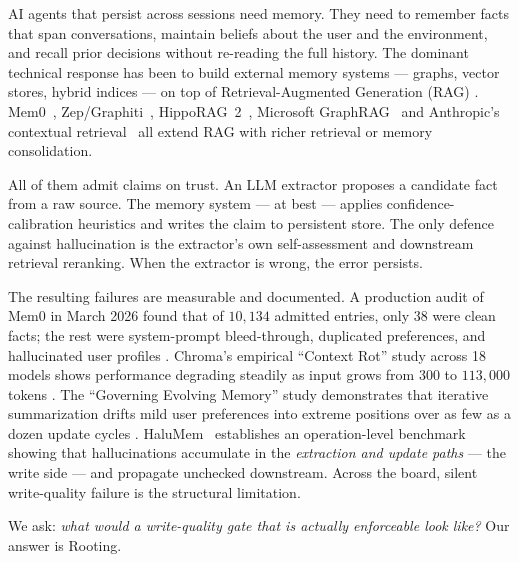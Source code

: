 \documentclass[10pt,a4paper]{article}
\begin{document}
AI agents that persist across sessions need memory. They need to remember
facts that span conversations, maintain beliefs about the user and the
environment, and recall prior decisions without re-reading the full history.
The dominant technical response has been to build external memory systems
--- graphs, vector stores, hybrid indices --- on top of Retrieval-Augmented
Generation (RAG) \cite{lewis2020rag}. Mem0~\cite{chhikara2025mem0},
Zep/Graphiti~\cite{rasmussen2025zep},
HippoRAG~2~\cite{gutierrez2025hipporag2}, Microsoft
GraphRAG~\cite{edge2024graphrag} and Anthropic's contextual
retrieval~\cite{anthropic2024contextual} all extend RAG with richer
retrieval or memory consolidation.

All of them admit claims on trust. An LLM extractor proposes a candidate
fact from a raw source. The memory system --- at best --- applies
confidence-calibration heuristics and writes the claim to persistent store.
The only defence against hallucination is the extractor's own self-assessment
and downstream retrieval reranking. When the extractor is wrong, the error
persists.

The resulting failures are measurable and documented. A production audit of
Mem0 in March 2026 found that of $10{,}134$ admitted entries, only $38$ were
clean facts; the rest were system-prompt bleed-through, duplicated
preferences, and hallucinated user profiles \cite{mem0junk}. Chroma's
empirical ``Context Rot'' study across 18 models shows performance degrading
steadily as input grows from $300$ to $113{,}000$ tokens
\cite{chromarot2025}. The ``Governing Evolving Memory'' study demonstrates
that iterative summarization drifts mild user preferences into extreme
positions over as few as a dozen update cycles \cite{evolvingmemory2026}.
HaluMem~\cite{halumem2025} establishes an operation-level benchmark showing
that hallucinations accumulate in the \emph{extraction and update paths}
--- the write side --- and propagate unchecked downstream. Across the
board, silent write-quality failure is the structural limitation.

We ask: \textit{what would a write-quality gate that is actually enforceable
look like?} Our answer is Rooting.
\end{document}
